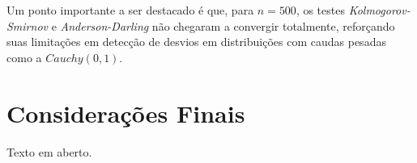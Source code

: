\documentclass[a4paper,11pt]{article} %
\begin{document}
Um ponto importante a ser destacado é que, para $n = 500$, os testes \textit{Kolmogorov-Smirnov} e \textit{Anderson-Darling} não chegaram a convergir totalmente, reforçando suas limitações em detecção de desvios em distribuições com caudas pesadas como a $Cauchy(0, 1)$.



\section{Considerações Finais}

Texto em aberto.

\end{document}

